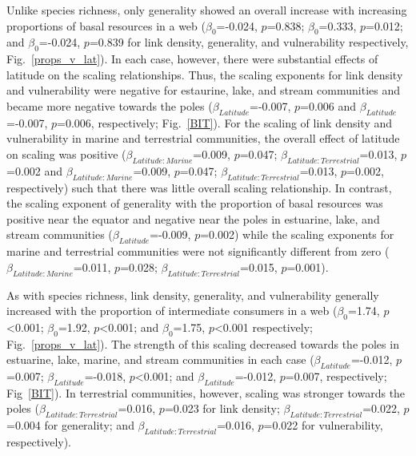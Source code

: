 \documentclass[12pt]{article}
\begin{document}
\begin{spacing}{1.0}
  Unlike species richness, only generality showed an overall increase with increasing
  proportions of basal resources in a web ($\beta_0$=-0.024, $p$=0.838;
  $\beta_0$=0.333, $p$=0.012; and $\beta_0$=-0.024, $p$=0.839 for link
  density, generality, and vulnerability respectively,
  Fig.~\ref{props_v_lat}). In each case, however, there were substantial
  effects of latitude on the scaling relationships. Thus, the scaling
  exponents for link density and vulnerability were negative for estaurine,
  lake, and stream communities and became more negative towards the poles
  ($\beta_{Latitude}$=-0.007, $p$=0.006 and $\beta_{Latitude}$=-0.007,
  $p$=0.006, respectively; Fig.~\ref{BIT}). For the scaling of link density and
  vulnerability in marine and terrestrial communities, the overall effect of
  latitude on scaling was positive ($\beta_{Latitude:Marine}$=0.009,
  $p$=0.047; $\beta_{Latitude:Terrestrial}$=0.013, $p$=0.002 and
  $\beta_{Latitude:Marine}$=0.009, $p$=0.047;
  $\beta_{Latitude:Terrestrial}$=0.013, $p$=0.002, respectively) such that
  there was little overall scaling relationship. In contrast, the scaling
  exponent of generality with the proportion of basal resources was positive
  near the equator and negative near the poles in estuarine, lake, and stream
  communities ($\beta_{Latitude}$=-0.009, $p$=0.002) while the scaling
  exponents for marine and terrestrial communities were not significantly
  different from zero ($\beta_{Latitude:Marine}$=0.011, $p$=0.028;
  $\beta_{Latitude:Terrestrial}$=0.015, $p$=0.001).


  As with species richness, link density, generality, and vulnerability
  generally increased with the proportion of intermediate consumers in a web
  ($\beta_0$=1.74, $p$\textless0.001; $\beta_0$=1.92, $p$\textless0.001; and
  $\beta_0$=1.75, $p$\textless0.001 respectively; Fig.~\ref{props_v_lat}).
  The strength of this scaling decreased towards the poles in estuarine,
  lake, marine, and stream communities in each case
  ($\beta_{Latitude}$=-0.012, $p$=0.007; $\beta_{Latitude}$=-0.018,
  $p$\textless0.001; and $\beta_{Latitude}$=-0.012, $p$=0.007, respectively;
  Fig~\ref{BIT}). In terrestrial communities, however, scaling was stronger
  towards the  poles ($\beta_{Latitude:Terrestrial}$=0.016, $p$=0.023 for
  link density; $\beta_{Latitude:Terrestrial}$=0.022, $p$=0.004 for
  generality; and $\beta_{Latitude:Terrestrial}$=0.016, $p$=0.022 for
  vulnerability, respectively).



\end{spacing}
\end{document}
